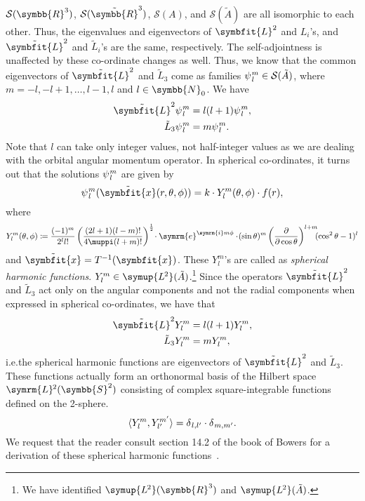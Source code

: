 \documentclass[12pt, a4 paper]{article}
\let\symcal\mathcal
\theoremstyle{definition}
\newcommand{\ltwo}{\symup{L\kern-0.5pt^2}}
\newcommand{\ltworthree}{\ltwo(\rr^3)}
\newcommand{\rr}{\symbb{R}}
\newcommand{\nn}{\symbb{N}_0}
\newcommand{\schwartz}{\symcal{S}}
\newcommand{\schwartzrthree}{\schwartz(\rr^3)}
\renewcommand{\i}{\symrm{i}}
\newcommand{\e}{\symrm{e}}
\renewcommand{\pi}{\muppi}
\newcommand{\lvecsquare}{\tilde{\symbfit{L}}^2}
\newcommand{\ltwoa}{\ltwo(\tilde{A})}
\newcommand{\sphe}{Y_l^m}
\begin{document}
    \(\schwartzrthree\), \(\schwartz(\tilde{\rr}^3)\), \(\schwartz(A)\), and \(\schwartz(\tilde{A})\) are all isomorphic to each other. Thus, the eigenvalues and eigenvectors of \(\symbfit{L}^2\) and \(L_i\)'s, and \(\lvecsquare\) and \(\tilde{L}_i\)'s are the same, respectively. The self-adjointness is unaffected by these co-ordinate changes as well. Thus, we know that the common eigenvectors of $\lvecsquare$ and $\tilde{L}_3$ come as families $\psi\kern0.5pt_l^m \in \schwartz(\tilde{A})$, where $m = -l, -l+1, \ldots, l-1, l$ and $l \in \nn$. We have
    \begin{align*}
        \lvecsquare \psi\kern0.5pt_l^m &= l(l+1)\psi\kern0.5pt_l^m,\\
        \tilde{L}_3 \psi\kern0.5pt_l^m &= m \psi\kern0.5pt_l^m.
    \end{align*}
    Note that $l$ can take only integer values, not half-integer values as we are dealing with the orbital angular momentum operator. In spherical co-ordinates, it turns out that the solutions $\psi\kern0.5pt_l^m$ are given by
    \[
        \psi\kern0.5pt_l^m (\tilde{\symbfit{x}} (r, \theta, \phi)) = k \cdot Y^m_l (\theta, \phi) \cdot f(r),
    \]
    where
    \[
        Y^m_l (\theta, \phi) \coloneq \frac{(-1)^m}{2^l l!}\left(\frac{(2l+1) (l-m)!}{4\pi (l+m)!}\right)^{\frac{1}{2}}\!\cdot\e^{\i m\phi}\cdot\!(\sin{\theta})^m \left(\frac{\partial}{\partial \cos{\theta}}\right)^{l+m}\!\!\!(\cos^2{\theta} -1)^l
    \]
    and $\tilde{\symbfit{x}} = T^{-1}(\symbfit{x})$. These $\sphe$'s are called as \textit{spherical harmonic functions}. \(\sphe \in \ltwoa\).\footnote{We have identified \(\ltworthree\) and \(\ltwoa\).} Since the operators $\lvecsquare$ and $\tilde{L}_3$ act only on the angular components and not the radial components when expressed in spherical co-ordinates, we have that
    \begin{align*}
        \lvecsquare \sphe &= l(l+1) \sphe,\\
        \tilde{L}_3 \sphe &= m \sphe,
    \end{align*}
    i.e.\@ the spherical harmonic functions are eigenvectors of $\lvecsquare$ and $\tilde{L}_3$. These functions actually form an orthonormal basis of the Hilbert space $\symrm{L}\kern-0.7pt^2(\symbb{S}^2)$ consisting of complex square-integrable functions defined on the 2-sphere.
    \[
        \langle \sphe , Y_{l'}^{m'} \rangle = \delta\kern0.5pt_{l, l'}\cdot\delta\kern0.4pt_{m, m'}.
    \]
    We request that the reader consult section 14.2 of the book of Bowers for a derivation of these spherical harmonic functions~\cite[p.~200]{Bowers}.
\end{document}
